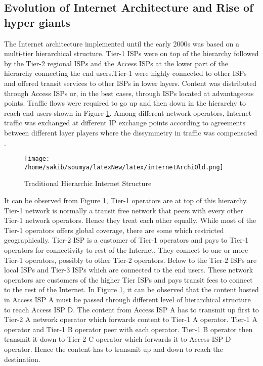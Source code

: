\subsection{Evolution of Internet Architecture and Rise of hyper giants\label{sec:archi}}
\noindent The Internet architecture implemented until the early 2000s was based on a multi-tier hierarchical structure. Tier-1 ISPs were on top of the hierarchy followed by the Tier-2 regional ISPs and the Access ISPs at the lower part of the hierarchy connecting the end users.Tier-1 were highly connected to other ISPs and offered transit services to other ISPs in lower layers. Content was distributed through Access ISPs or, in the best cases, through ISPs located at advantageous points. Traffic flows were required to go up and then down in the hierarchy to reach end users shown in Figure \ref{fig:interArchiOld}. Among different network operators, Internet traffic was exchanged at different IP exchange points according to agreements between different layer players where the dissymmetry in traffic was compensated \cite{Krishnan1} \cite{Bernhard} \cite{Ager}. \\

\begin{figure}[htb]
  \centering
  \texttt{[image: /home/sakib/soumya/latexNew/latex/internetArchiOld.png]}\\
  \caption{Traditional Hierarchic Internet Structure}
  \label{fig:interArchiOld}
\end{figure}

\noindent It can be observed from Figure \ref{fig:interArchiOld}, Tier-1 operators are at top of this hierarchy. Tier-1 network is normally a transit free network that peers with every other Tier-1 network operators. Hence they treat each other equally. While most of the Tier-1 operators offers global coverage, there are some which restricted geographically. Tier-2 ISP is a customer of Tier-1 operators and pays to Tier-1 operators for connectivity to rest of the Internet. They connect to one or more Tier-1 operators, possibly to other Tier-2 operators. Below to the Tier-2 ISPs are local ISPs and Tier-3 ISPs which are connected to the end users. These network operators are customers of the higher Tier ISPs and pays transit fees to connect to the rest of the Internet. In Figure \ref{fig:interArchiOld}, it can be observed that the content hosted in Access ISP A must be passed through different level of hierarchical structure to reach Access ISP D. The content from Access ISP A has to transmit up first to Tier-2 A network operator which forwards content to Tier-1 A operator. Tier-1 A operator and Tier-1 B operator peer with each operator. Tier-1 B operator then transmit it down to Tier-2 C operator which forwards it to Access ISP D operator. Hence the content has to transmit up and down to reach the destination.

